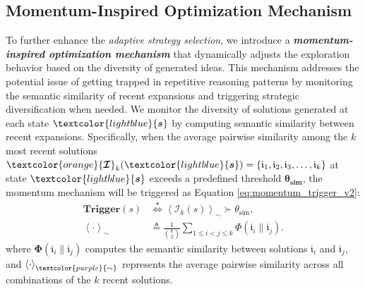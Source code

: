\documentclass[11pt]{article}
\theoremstyle{definition}
\theoremstyle{remark}
\begin{document}
\subsection{Momentum-Inspired Optimization Mechanism}

To further enhance the \textit{adaptive strategy selection}, we introduce a \textbf{\textit{momentum-inspired optimization mechanism}} that dynamically adjusts the exploration behavior based on the diversity of generated ideas. This mechanism addresses the potential issue of getting trapped in repetitive reasoning patterns by monitoring the semantic similarity of recent expansions and triggering strategic diversification when needed. 
We monitor the diversity of solutions generated at each state $\textcolor{lightblue}{\boldsymbol{s}}$  by computing semantic similarity between recent expansions. Specifically, when the average pairwise similarity among the $k$ most recent solutions $\textcolor{orange}{\boldsymbol{\mathcal{I}}}_k(\textcolor{lightblue}{\boldsymbol{s}}) = \{\mathfrak{i}_1, \mathfrak{i}_2, \mathfrak{i}_3, \ldots, \mathfrak{i}_k\}$ at state $\textcolor{lightblue}{\boldsymbol{s}}$ exceeds a predefined threshold $\boldsymbol{\theta}_{\textbf{sim}}$, the momentum mechanism will be triggered as Equation \ref{eq:momentum_trigger_v2}:
\begin{equation}
\label{eq:momentum_trigger_v2}
\begin{aligned}
\textbf{Trigger}(s)
&\overset{\star}{\iff}
\left\langle \mathcal{I}_k(s) \right\rangle_{\sim}
\succ \theta_{\mathrm{sim}}, \\
\left\langle \cdot \right\rangle_{\sim}
&\triangleq
\frac{1}{\binom{k}{2}}
\sum_{1 \leq i < j \leq k}
\Phi\left(\mathfrak{i}_i \parallel \mathfrak{i}_j\right).
\end{aligned}
\end{equation}
where $\boldsymbol{\Phi}\left(\mathfrak{i}_i \parallel \mathfrak{i}_j\right)$ computes the semantic similarity between solutions $\mathfrak{i}_i$ and $\mathfrak{i}_j$, and $\left\langle \cdot \right\rangle_{\textcolor{purple}{\sim}}$ represents the average pairwise similarity across all combinations of the $k$ recent solutions.
\end{document}
